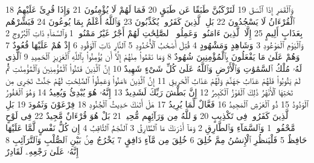 {\tiny\colorbox{cl_aya}{18}} وَٱلْقَمَرِ إِذَا ٱتَّسَقَ
{\tiny\colorbox{cl_aya}{19}} لَتَرْكَبُنَّ طَبَقًا عَن طَبَقٍ
{\tiny\colorbox{cl_aya}{20}} فَمَا لَهُمْ لَا يُؤْمِنُونَ
{\tiny\colorbox{cl_aya}{21}} وَإِذَا قُرِئَ عَلَيْهِمُ ٱلْقُرْءَانُ لَا يَسْجُدُونَ
{\tiny\colorbox{cl_aya}{22}} بَلِ ٱلَّذِينَ كَفَرُوا۟ يُكَذِّبُونَ
{\tiny\colorbox{cl_aya}{23}} وَٱللَّهُ أَعْلَمُ بِمَا يُوعُونَ
{\tiny\colorbox{cl_aya}{24}} فَبَشِّرْهُم بِعَذَابٍ أَلِيمٍ
{\tiny\colorbox{cl_aya}{25}} إِلَّا ٱلَّذِينَ ءَامَنُوا۟ وَعَمِلُوا۟ ٱلصَّٰلِحَٰتِ لَهُمْ أَجْرٌ غَيْرُ مَمْنُونٍۭ
{\tiny\colorbox{cl_aya}{1}} وَٱلسَّمَآءِ ذَاتِ ٱلْبُرُوجِ
{\tiny\colorbox{cl_aya}{2}} وَٱلْيَوْمِ ٱلْمَوْعُودِ
{\tiny\colorbox{cl_aya}{3}} وَشَاهِدٍ وَمَشْهُودٍ
{\tiny\colorbox{cl_aya}{4}} قُتِلَ أَصْحَٰبُ ٱلْأُخْدُودِ
{\tiny\colorbox{cl_aya}{5}} ٱلنَّارِ ذَاتِ ٱلْوَقُودِ
{\tiny\colorbox{cl_aya}{6}} إِذْ هُمْ عَلَيْهَا قُعُودٌ
{\tiny\colorbox{cl_aya}{7}} وَهُمْ عَلَىٰ مَا يَفْعَلُونَ بِٱلْمُؤْمِنِينَ شُهُودٌ
{\tiny\colorbox{cl_aya}{8}} وَمَا نَقَمُوا۟ مِنْهُمْ إِلَّآ أَن يُؤْمِنُوا۟ بِٱللَّهِ ٱلْعَزِيزِ ٱلْحَمِيدِ
{\tiny\colorbox{cl_aya}{9}} ٱلَّذِى لَهُۥ مُلْكُ ٱلسَّمَٰوَٰتِ وَٱلْأَرْضِ وَٱللَّهُ عَلَىٰ كُلِّ شَىْءٍ شَهِيدٌ
{\tiny\colorbox{cl_aya}{10}} إِنَّ ٱلَّذِينَ فَتَنُوا۟ ٱلْمُؤْمِنِينَ وَٱلْمُؤْمِنَٰتِ ثُمَّ لَمْ يَتُوبُوا۟ فَلَهُمْ عَذَابُ جَهَنَّمَ وَلَهُمْ عَذَابُ ٱلْحَرِيقِ
{\tiny\colorbox{cl_aya}{11}} إِنَّ ٱلَّذِينَ ءَامَنُوا۟ وَعَمِلُوا۟ ٱلصَّٰلِحَٰتِ لَهُمْ جَنَّٰتٌ تَجْرِى مِن تَحْتِهَا ٱلْأَنْهَٰرُ ذَٰلِكَ ٱلْفَوْزُ ٱلْكَبِيرُ
{\tiny\colorbox{cl_aya}{12}} إِنَّ بَطْشَ رَبِّكَ لَشَدِيدٌ
{\tiny\colorbox{cl_aya}{13}} إِنَّهُۥ هُوَ يُبْدِئُ وَيُعِيدُ
{\tiny\colorbox{cl_aya}{14}} وَهُوَ ٱلْغَفُورُ ٱلْوَدُودُ
{\tiny\colorbox{cl_aya}{15}} ذُو ٱلْعَرْشِ ٱلْمَجِيدُ
{\tiny\colorbox{cl_aya}{16}} فَعَّالٌ لِّمَا يُرِيدُ
{\tiny\colorbox{cl_aya}{17}} هَلْ أَتَىٰكَ حَدِيثُ ٱلْجُنُودِ
{\tiny\colorbox{cl_aya}{18}} فِرْعَوْنَ وَثَمُودَ
{\tiny\colorbox{cl_aya}{19}} بَلِ ٱلَّذِينَ كَفَرُوا۟ فِى تَكْذِيبٍ
{\tiny\colorbox{cl_aya}{20}} وَٱللَّهُ مِن وَرَآئِهِم مُّحِيطٌۢ
{\tiny\colorbox{cl_aya}{21}} بَلْ هُوَ قُرْءَانٌ مَّجِيدٌ
{\tiny\colorbox{cl_aya}{22}} فِى لَوْحٍ مَّحْفُوظٍۭ
{\tiny\colorbox{cl_aya}{1}} وَٱلسَّمَآءِ وَٱلطَّارِقِ
{\tiny\colorbox{cl_aya}{2}} وَمَآ أَدْرَىٰكَ مَا ٱلطَّارِقُ
{\tiny\colorbox{cl_aya}{3}} ٱلنَّجْمُ ٱلثَّاقِبُ
{\tiny\colorbox{cl_aya}{4}} إِن كُلُّ نَفْسٍ لَّمَّا عَلَيْهَا حَافِظٌ
{\tiny\colorbox{cl_aya}{5}} فَلْيَنظُرِ ٱلْإِنسَٰنُ مِمَّ خُلِقَ
{\tiny\colorbox{cl_aya}{6}} خُلِقَ مِن مَّآءٍ دَافِقٍ
{\tiny\colorbox{cl_aya}{7}} يَخْرُجُ مِنۢ بَيْنِ ٱلصُّلْبِ وَٱلتَّرَآئِبِ
{\tiny\colorbox{cl_aya}{8}} إِنَّهُۥ عَلَىٰ رَجْعِهِۦ لَقَادِرٌ
